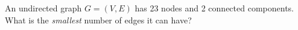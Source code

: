 \begin{prob}
    An undirected graph $G = (V, E)$ has 23 nodes and 2 connected components.
    What is the \emph{smallest} number of edges it can have?


\end{prob}
